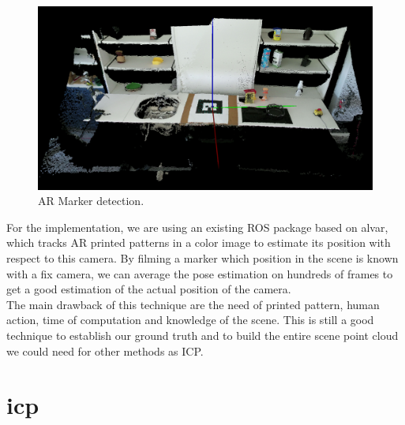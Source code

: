 \begin{figure}[h!]
    \centering
    \includegraphics[width=\textwidth]{images/marker_detection.png}
    \caption{AR Marker detection.}
    \label{fig:ar_marker}
\end{figure}

For the implementation, we are using an existing ROS package based on alvar, which tracks AR printed patterns in a color image to estimate its position with respect to this camera. By filming a marker which position in the scene is known with a fix camera, we can average the pose estimation on hundreds of frames to get a good estimation of the actual position of the camera. \\
The main drawback of this technique are the need of printed pattern, human action, time of computation and knowledge of the scene. This is still a good technique to establish our ground truth and to build the entire scene point cloud we could need for other methods as ICP.


\section{\acrlong{icp}}

